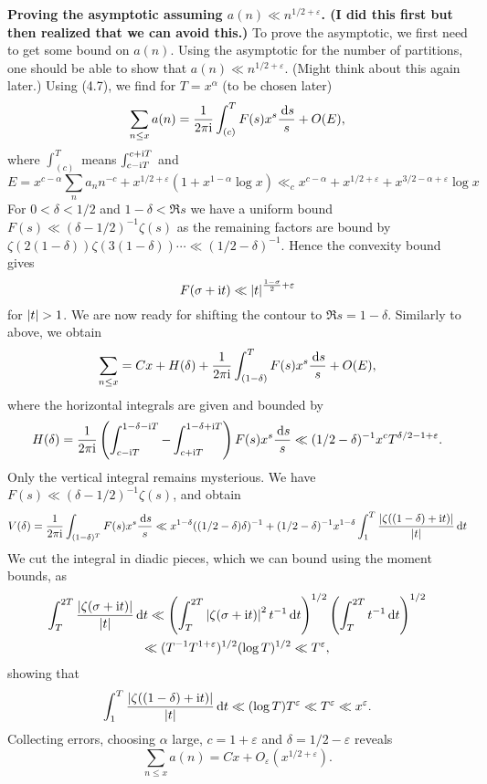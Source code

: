 \documentclass[a4paper,11pt]{article}
\begin{document}
\textbf{Proving the asymptotic assuming $a(n) \ll n^{1/2+\varepsilon}$. (I did
this first but then realized that we can avoid this.)} To prove
    the asymptotic, we first need to get some bound on $a(n)$. Using 
the asymptotic for the number of partitions, one should be able to show that 
$a(n) \ll n^{1/2+\varepsilon}$. (Might think about this again later.) 
Using (4.7), we find for $T = x^\alpha$ (to be chosen later) 
\[
    \sum_{n \leq x} a(n) = \frac{1}{2 \pi \mathrm i} \int_{(c)}^T F(s) x^s \frac{\mathrm{\,d} s}s 
    + O(E),
\]
where $\int_{(c)}^T$ means $\int_{c-\mathrm i T}^{c+\mathrm i T}$ and 
\[
    E = x^{c-\alpha} \sum_n a_n n^{-c} + x^{1/2+\varepsilon}(1+ x^{1-\alpha}\log x)
    \ll_{c} x^{c-\alpha} + x^{1/2+\varepsilon} + x^{3/2 - \alpha + \varepsilon} \log x
\]
For $0< \delta < 1/2$ and $1-\delta < \Re s$ we have a uniform bound $F(s) \ll
(\delta-1/2)^{-1} \zeta(s)$ as the remaining factors are bound by $\zeta(2(1-\delta))
\zeta(3(1-\delta)) \cdots \ll (1/2-\delta)^{-1}$. Hence the convexity bound gives
$$F(\sigma + \mathrm i t) \ll \left\lvert t \right\rvert^{\frac {1-\sigma}2 + \varepsilon}$$
for $\left\lvert t \right\rvert > 1$.
We are now ready for shifting the contour to $\Re s = 1-\delta$. Similarly to above,
we obtain
$$\sum_{n \leq x} = Cx + H(\delta) + \frac{1}{2 \pi \mathrm i} \int_{(1-\delta)}^T F(s) x^s
\frac{\mathrm{\,d} s}s + O(E),$$
where the horizontal integrals are given and bounded by 
\[
    H(\delta) = \frac{1}{2 \pi \mathrm i} \left( \int_{c-\mathrm i T}^{1-\delta - \mathrm i T} - \int_{c+\mathrm i
    T}^{1-\delta + \mathrm i T} \right) F(s) x^s \frac{\mathrm{\,d} s }s \ll (1/2-\delta)^{-1}
    x^c T^{\delta/2-1 + \varepsilon}.
\]
Only the vertical integral remains mysterious. We have $F(s) \ll (\delta-1/2)^{-1} \zeta(s)$, and obtain
\[
    V(\delta) = \frac{1}{2 \pi \mathrm i} \int_{(1-\delta)^T} F(s) x^s \frac{\mathrm{\,d} s }s 
\ll x^{1-\delta}((1/2-\delta)\delta)^{-1} + (1/2-\delta)^{-1}x^{1-\delta}\int_1^T \frac{\left\lvert \zeta((1-\delta) + \mathrm i t) \right\rvert}{\left\lvert t \right\rvert} \mathrm{\,d} t
\]
We cut the integral in diadic pieces, which we can bound using 
the moment bounds, as
\begin{multline*}
    \int_T^{2T} \frac{\left\lvert \zeta(\sigma + \mathrm i t) \right\rvert}{\left\lvert t \right\rvert} \mathrm{\,d} t
    \ll \left(\int_T^{2T}\left\lvert \zeta(\sigma+\mathrm i t) \right\rvert^2 t^{-1} \mathrm{\,d} t \right)^{1/2}
    \left( \int_T^{2T} t^{-1} \mathrm{\,d} t\right)^{1/2} \\
    \ll (T^{-1} T^{1+\varepsilon})^{1/2} (\log T)^{1/2} \ll
    T^\varepsilon,
\end{multline*}
showing that 
\[
    \int_1^T \frac{\left\lvert \zeta((1-\delta) + \mathrm i t) \right\rvert}{\left\lvert t \right\rvert} \mathrm{\,d} t
    \ll (\log T) T^\varepsilon \ll T^\varepsilon \ll x^\varepsilon.
\]
Collecting errors, choosing $\alpha$ large, $c = 1+\varepsilon$ and $\delta =
1/2-\varepsilon$ reveals
\[
    \sum_{n \leq x} a(n) = Cx + O_{\varepsilon}(x^{1/2+\varepsilon}).
\]

\contactend
\end{document}
